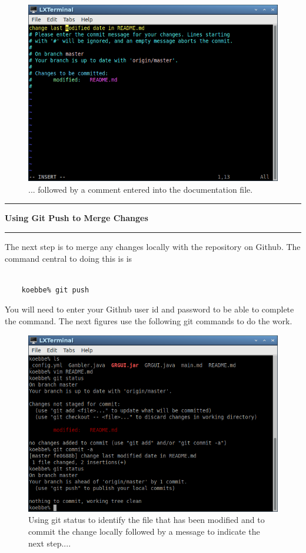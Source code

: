 \documentclass[10pt,fleqn]{article}
\begin{document}
\vfill
\begin{figure}[h]
\centering
\includegraphics[width=5.0in]{../images/git_14.png}
\caption{... followed by a comment entered into the documentation file.}
\end{figure}
\eject
\vskip0.1in\hrule\vskip0.1in\noindent
{\bf Using Git Push to Merge Changes} 
\vskip0.1in\hrule\vskip0.1in\noindent
The next step is to merge any changes locally with the repository on Github.
The command central to doing this is is
\begin{verbatim}

    koebbe% git push

\end{verbatim}
You will need to enter your Github user id and password to be able to complete
the command. The next figures use the following git commands to do the work.
\vfill
\begin{figure}[h]
\centering
\includegraphics[width=5.0in]{../images/git_15.png}
\caption{Using git status to identify the file that has been modified and to
commit the change locally followed by a message to indicate the next step....}
\end{figure}
\end{document}
